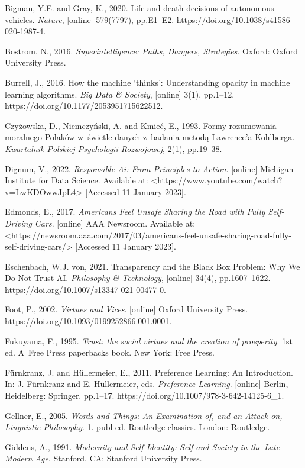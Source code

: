 Bigman, Y.E. and Gray, K., 2020. Life and death decisions of autonomous vehicles. \textit{Nature}, [online] 579(7797), pp.E1–E2. https://doi.org/10.1038/s41586-020-1987-4.

Bostrom, N., 2016. \textit{Superintelligence: Paths, Dangers, Strategies}. Oxford: Oxford University Press.

Burrell, J., 2016. How the machine ‘thinks': Understanding opacity in machine learning algorithms. \textit{Big Data \& Society}, [online] 3(1), pp.1–12. https://doi.org/10.1177/2053951715622512.

Czyżowska, D., Niemczyński, A. and Kmieć, E., 1993. Formy rozumowania moralnego Polaków w~świetle danych z~badania metodą Lawrence'a Kohlberga. \textit{Kwartalnik Polskiej Psychologii Rozwojowej}, 2(1), pp.19–38.

Dignum, V., 2022. \textit{Responsible Ai: From Principles to Action}. [online] Michigan Institute for Data Science. Available at: {\textless}https://www.youtube.com/watch?v=LwKDOwwJpL4{\textgreater} [Accessed 11 January 2023].

Edmonds, E., 2017. \textit{Americans Feel Unsafe Sharing the Road with Fully Self-Driving Cars}. [online] AAA Newsroom. Available at: {\textless}https://newsroom.aaa.com/2017/03/americans-feel-unsafe-sharing-road-fully-self-driving-cars/{\textgreater} [Accessed 11 January 2023].

Eschenbach, W.J. von, 2021. Transparency and the Black Box Problem: Why We Do Not Trust AI. \textit{Philosophy \& Technology}, [online] 34(4), pp.1607–1622. https://doi.org/10.1007/s13347-021-00477-0.

Foot, P., 2002. \textit{Virtues and Vices}. [online] Oxford University Press. https://doi.org/10.1093/0199252866.001.0001.

Fukuyama, F., 1995. \textit{Trust: the social virtues and the creation of prosperity}. 1st ed. A~Free Press paperbacks book. New York: Free Press.

Fürnkranz, J. and Hüllermeier, E., 2011. Preference Learning: An Introduction. In: J. Fürnkranz and E. Hüllermeier, eds. \textit{Preference Learning}. [online] Berlin, Heidelberg: Springer. pp.1–17. https://doi.org/10.1007/978-3-642-14125-6\_1.

Gellner, E., 2005. \textit{Words and Things: An Examination of, and an Attack on, Linguistic Philosophy}. 1. publ ed. Routledge classics. London: Routledge.

Giddens, A., 1991. \textit{Modernity and Self-Identity: Self and Society in the Late Modern Age}. Stanford, CA: Stanford University Press.

